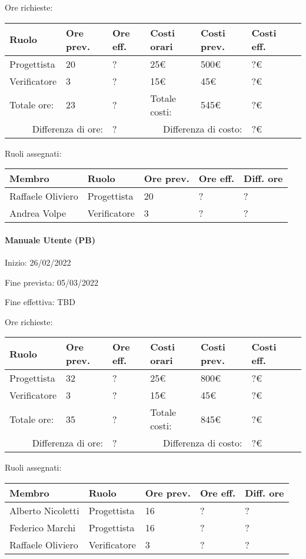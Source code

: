 \documentclass[a4paper, 12pt]{article}
\begin{document}
Ore richieste:\\[0.5em]
\begin{tabular}{|l|l|l||l|l|l|l|}\hline
Ruolo & Ore prev. & Ore eff. & Costi orari & Costi prev. & Costi eff.\\\hline
Progettista & 20 & ? & 25\euro & 500\euro & ?\euro \\\hline
Verificatore & 3 & ? & 15\euro & 45\euro & ?\euro \\\hline
Totale ore: & 23 & ? & Totale costi: & 545\euro & ?\euro \\\hline
\multicolumn{2}{|r|}{Differenza di ore:} & ? & \multicolumn{2}{r|}{Differenza di costo:} & ?\euro \\\hline
\end{tabular}

Ruoli assegnati:\\[0.5em]
\begin{tabular}{|l|l|l|l|l|}\hline
Membro & Ruolo & Ore prev. & Ore eff. & Diff. ore \\\hline
Raffaele Oliviero & Progettista & 20 & ? & ? \\\hline
Andrea Volpe & Verificatore & 3 & ? & ? \\\hline
\end{tabular}

\paragraph{Manuale Utente (PB)}
Inizio: 26/02/2022\par
Fine prevista: 05/03/2022\par
Fine effettiva: TBD

Ore richieste:\\[0.5em]
\begin{tabular}{|l|l|l||l|l|l|l|}\hline
Ruolo & Ore prev. & Ore eff. & Costi orari & Costi prev. & Costi eff.\\\hline
Progettista & 32 & ? & 25\euro & 800\euro & ?\euro \\\hline
Verificatore & 3 & ? & 15\euro & 45\euro & ?\euro \\\hline
Totale ore: & 35 & ? & Totale costi: & 845\euro & ?\euro \\\hline
\multicolumn{2}{|r|}{Differenza di ore:} & ? & \multicolumn{2}{r|}{Differenza di costo:} & ?\euro \\\hline
\end{tabular}

Ruoli assegnati:\\[0.5em]
\begin{tabular}{|l|l|l|l|l|}\hline
Membro & Ruolo & Ore prev. & Ore eff. & Diff. ore \\\hline
Alberto Nicoletti & Progettista & 16 & ? & ? \\\hline
Federico Marchi & Progettista & 16 & ? & ? \\\hline
Raffaele Oliviero & Verificatore & 3 & ? & ? \\\hline
\end{tabular}
\end{document}
